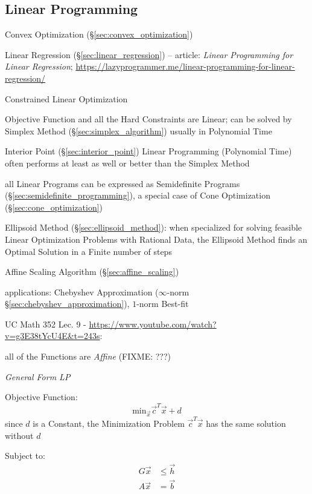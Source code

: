 \subsection{Linear Programming}\label{sec:linear_programming}

\fist Convex Optimization (\S\ref{sec:convex_optimization})

\fist Linear Regression (\S\ref{sec:linear_regression}) -- article: \emph{Linear
  Programming for Linear Regression};
\url{https://lazyprogrammer.me/linear-programming-for-linear-regression/}

Constrained Linear Optimization

Objective Function and all the Hard Constraints are Linear; can be solved by
Simplex Method (\S\ref{sec:simplex_algorithm}) usually in Polynomial Time

Interior Point (\S\ref{sec:interior_point}) Linear Programming
(Polynomial Time) often performs at least as well or better than the Simplex
Method

all Linear Programs can be expressed as Semidefinite Programs
(\S\ref{sec:semidefinite_programming}), a special case of Cone Optimization
(\S\ref{sec:cone_optimization})

Ellipsoid Method (\S\ref{sec:ellipsoid_method}): when specialized for solving
feasible Linear Optimization Problems with Rational Data, the Ellipsoid Method
finds an Optimal Solution in a Finite number of steps

Affine Scaling Algorithm (\S\ref{sec:affine_scaling})

applications: Chebyshev Approximation ($\infty$-norm
\S\ref{sec:chebyshev_approximation}), $1$-norm Best-fit


UC Math 352 Lec. 9 - \url{https://www.youtube.com/watch?v=g3E38tYcU4E&t=243s}:

all of the Functions are \emph{Affine} (FIXME: ???)

\emph{General Form LP}

Objective Function:
\[
  \mathrm{min}_{\vec{x}} \vec{c}^T\vec{x} + d
\]
since $d$ is a Constant, the Minimization Problem $\vec{c}^T\vec{x}$ has the
same solution without $d$

Subject to:
\begin{align*}
  G\vec{x} & \leq \vec{h} \\
  A\vec{x} & = \vec{b}
\end{align*}

